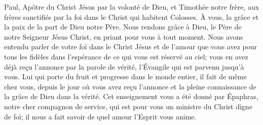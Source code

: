 Paul, Apôtre du Christ Jésus par la volonté de Dieu, et Timothée notre frère,
	aux frères sanctifiés par la foi dans le Christ qui habitent Colosses.
À vous, la grâce et la paix de la part de Dieu notre Père.
Nous rendons grâce à Dieu, le Père de notre Seigneur Jésus Christ,
	en priant pour vous à tout moment.
Nous avons entendu parler de votre foi dans le Christ Jésus
	et de l’amour que vous avez pour tous les fidèles
	dans l’espérance de ce qui vous est réservé au ciel;
	vous en avez déjà reçu l’annonce par la parole de vérité,
	l’Évangile qui est parvenu jusqu’à vous.
Lui qui porte du fruit et progresse dans le monde entier,
	il fait de même chez vous, depuis le jour où vous avez reçu l’annonce
		et la pleine connaissance de la grâce de Dieu dans la vérité.
Cet enseignement vous a été donné par Épaphras, notre cher compagnon de service,
	qui est pour vous un ministre du Christ digne de foi;
	il nous a fait savoir de quel amour l’Esprit vous anime.
